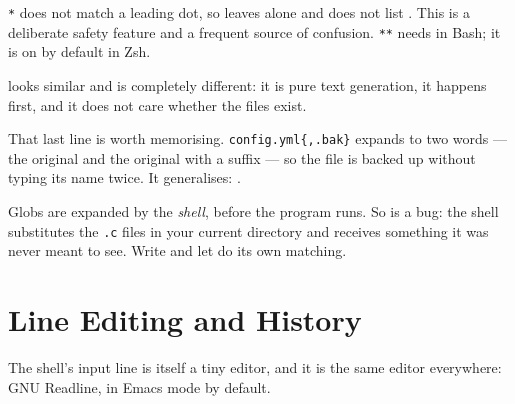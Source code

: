 \begin{note}
	\texttt{*} does not match a leading dot, so  leaves
	 alone and  does not list . This is a
	deliberate safety feature and a frequent source of confusion. \texttt{**}
	needs  in Bash; it is on by default in Zsh.
\end{note}

 looks similar and is completely different: it is pure
text generation, it happens first, and it does not care whether the files exist.


\begin{eg}
	That last line is worth memorising. \texttt{config.yml\{,.bak\}} expands to two
	words --- the original and the original with a suffix --- so the file is
	backed up without typing its name twice. It generalises:
	.
\end{eg}

\begin{moral}
	Globs are expanded by the \emph{shell}, before the program runs. So
	 is a bug: the shell substitutes the \texttt{.c} files in
	your current directory and  receives something it was never meant to
	see. Write  and let  do its own matching.
\end{moral}

\section{Line Editing and History}\label{sec:sh-readline}

The shell's input line is itself a tiny editor, and it is the same editor
everywhere: GNU Readline, in Emacs mode by default.

